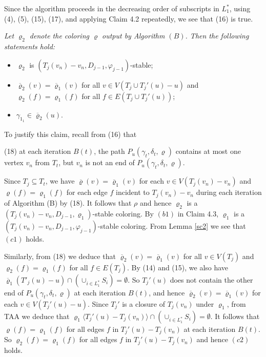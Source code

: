 \documentclass[11pt]{article}
\newcommand{\rhobar}{\overline{\varrho}}
\newcommand{\phiv}{\varphi}
\begin{document}
Since the algorithm proceeds in the decreasing order of subscripts in $L^*_1$, using (4), (5), (15), (17),
and applying Claim 4.2 repeatedly, we see that (16) is true.  

\vskip 2mm
 {\em 
Let $\varrho_2$ denote the coloring $\varrho$ output by Algorithm $(B)$. Then the following statements hold:
\begin{itemize}
\vspace{-2mm}
\item[(c1)] $\varrho_2 $ is $(T_j(v_n)-v_n,D_{j-1},\varphi_{j-1})$-stable;
\vspace{-2mm}
\item[(c2)] $\overline{\varrho}_2 (v)=\overline{\varrho}_1(v)$ for all $v\in V(T_j\cup T_j'(u)-u)$ and $\varrho_2 (f)=\varrho_1(f)$ for all $f\in E(T_j\cup T_j'(u))$;
\vspace{-2mm}
\item[(c3)] $\gamma_{1_1}\in \overline{\varrho}_2 (u)$.
\end{itemize}	}


To justify this claim, recall from (16) that 

(18) at each iteration $B(t)$, the path $P_u(\gamma_t, \delta_t, \varrho)$ contains at most one vertex $v_n$ from 
$T_t$, but $v_n$ is not an end of $P_u(\gamma_t, \delta_t, \varrho)$. 

Since $T_j \subseteq T_t$, we have  $\rhobar(v) = \rhobar_1(v)$ for each $v\in V(T_j(v_n)-v_n)$  and 
$\varrho(f) = \varrho_1(f)$ for each edge $f$ incident to $T_j(v_n) - v_n$ during each iteration of Algorithm (B) 
by (18). It follows that $\rho$ and hence $\varrho_2$ is a $(T_j(v_n) - v_n, D_{j-1}, \varrho_1)$-stable coloring. 
By $(b1)$ in Claim 4.3, $\varrho_1$ is a $(T_j(v_n) -v_n, D_{j-1}, \phiv_{j-1})$-stable coloring. From 
Lemma \ref{sc2} we see that $(c1)$ holds. 

Similarly, from (18) we deduce that $\rhobar_2(v) = \rhobar_1(v)$ for all $v\in V(T_j)$ and $\varrho_2(f) = \varrho_1(f)$ 
for all $f\in E(T_j)$. By (14) and (15), we also have $\rhobar_1(T'_j(u)-u)\cap (\cup_{i \in L_1^*} S_i) = \emptyset$. 
So $T_j'(u)$ does not contain the other end of $P_u(\gamma_t, \delta_t, \varrho)$ at each iteration $B(t)$, and hence
$\rhobar_2(v) = \rhobar_1(v)$ for each $v\in  V(T_j'(u) -u)$. Since $T_{j}'$ is a 
closure of $T_j(v_n)$ under $\varrho_1$, from TAA we deduce that  $\varrho_1 \langle T_j'(u) - T_j(v_n) \rangle 
\cap (\cup_{i\in L_1^*}S_i) = \emptyset$. It follows that $\varrho(f) = \varrho_1(f)$ for all edges $f$ in $T_j'(u) - T_j(v_n)$ 
at each iteration $B(t)$. So $\varrho_2(f) = \varrho_1(f)$ for all edges $f$ in $T_j'(u) - T_j(v_n)$
and hence $(c2)$ holds.    
\end{document}
